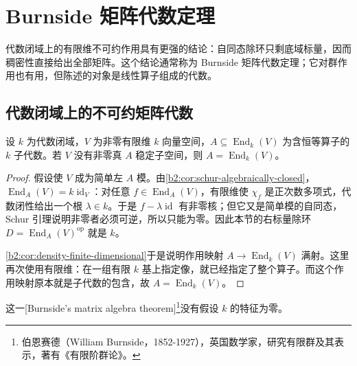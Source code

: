
\section{Burnside 矩阵代数定理}
\label{b2:sec:1405}

代数闭域上的有限维不可约作用具有更强的结论：自同态除环只剩底域标量，因而稠密性直接给出全部矩阵。这个结论通常称为 Burnside 矩阵代数定理；它对群作用也有用，但陈述的对象是线性算子组成的代数。

%
%
%

\subsection{代数闭域上的不可约矩阵代数}
\label{b2:subsec:1405:01}

\begin{theorem}\label{b2:thm:burnside-matrix-algebra}
	设 \(k\) 为代数闭域，\(V\) 为非零有限维 \(k\) 向量空间，\(A\subseteq\operatorname{End}_k(V)\) 为含恒等算子的 \(k\) 子代数。若 \(V\) 没有非零真 \(A\) 稳定子空间，则 \(A=\operatorname{End}_k(V)\)。
\end{theorem}
\begin{proof}
	假设使 \(V\) 成为简单左 \(A\) 模。由\cref{b2:cor:schur-algebraically-closed}，\(\operatorname{End}_A(V)=k\operatorname{id}_V\)：对任意 \(f\in\operatorname{End}_A(V)\)，有限维使 \(\chi_f\) 是正次数多项式，代数闭性给出一个根 \(\lambda\in k\)。于是 \(f-\lambda\operatorname{id}\) 有非零核；但它又是简单模的自同态，Schur 引理说明非零者必须可逆，所以只能为零。因此本节的右标量除环 \(D=\operatorname{End}_A(V)^{\mathrm{op}}\) 就是 \(k\)。

	\cref{b2:cor:density-finite-dimensional}于是说明作用映射 \(A\to\operatorname{End}_k(V)\) 满射。这里再次使用有限维：在一组有限 \(k\) 基上指定像，就已经指定了整个算子。而这个作用映射原本就是子代数的包含，故 \(A=\operatorname{End}_k(V)\)。
\end{proof}

这一[Burnside's matrix algebra theorem]\footnote{伯恩赛德（William Burnside，1852-1927），英国数学家，研究有限群及其表示，著有《有限阶群论》。}没有假设 \(k\) 的特征为零。

